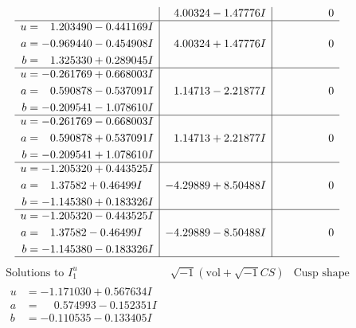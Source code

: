 \documentclass[1p]{elsarticle_modified}
\theoremstyle{definition}
\newcommand{\I}{\sqrt{-1}}
\begin{document}
$$\begin{array}{c|c|c}
 & \phantom{-}4.00324 - 1.47776 I & \phantom{-0.000000 } 0 \\ \hline\begin{aligned}
u &= \phantom{-}1.203490 - 0.441169 I \\
a &= -0.969440 - 0.454908 I \\
b &= \phantom{-}1.325330 + 0.289045 I\end{aligned}
 & \phantom{-}4.00324 + 1.47776 I & \phantom{-0.000000 } 0 \\ \hline\begin{aligned}
u &= -0.261769 + 0.668003 I \\
a &= \phantom{-}0.590878 - 0.537091 I \\
b &= -0.209541 - 1.078610 I\end{aligned}
 & \phantom{-}1.14713 - 2.21877 I & \phantom{-0.000000 } 0 \\ \hline\begin{aligned}
u &= -0.261769 - 0.668003 I \\
a &= \phantom{-}0.590878 + 0.537091 I \\
b &= -0.209541 + 1.078610 I\end{aligned}
 & \phantom{-}1.14713 + 2.21877 I & \phantom{-0.000000 } 0 \\ \hline\begin{aligned}
u &= -1.205320 + 0.443525 I \\
a &= \phantom{-}1.37582 + 0.46499 I \\
b &= -1.145380 + 0.183326 I\end{aligned}
 & -4.29889 + 8.50488 I & \phantom{-0.000000 } 0 \\ \hline\begin{aligned}
u &= -1.205320 - 0.443525 I \\
a &= \phantom{-}1.37582 - 0.46499 I \\
b &= -1.145380 - 0.183326 I\end{aligned}
 & -4.29889 - 8.50488 I & \phantom{-0.000000 } 0\\
 \hline 
 \end{array}$$\newpage$$\begin{array}{c|c|c}  
\text{Solutions to }I^u_{1}& \I (\text{vol} + \sqrt{-1}CS) & \text{Cusp shape}\\
 \hline 
\begin{aligned}
u &= -1.171030 + 0.567634 I \\
a &= \phantom{-}0.574993 - 0.152351 I \\
b &= -0.110535 - 0.133405 I\end{aligned}

\end{array}$$
\end{document}
